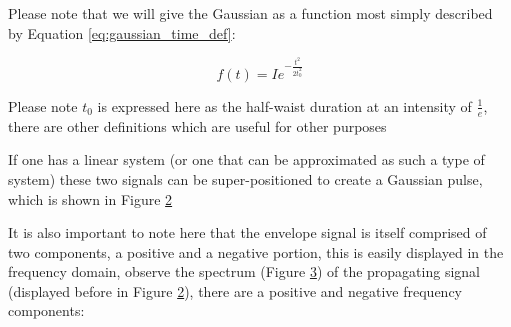\documentclass[colorlinks,11pt,a4paper,normalphoto,withhyper,ragged2e]{altareport}
\begin{document}
	Please note that we will give the Gaussian as a function most simply described by Equation \ref{eq:gaussian_time_def}:
	
	\begin{equation} \label{eq:gaussian_time_def}
		f(t) = I e^{-\frac{t^2}{2t^2_0}}
	\end{equation}
	
	{\footnotesize Please note $t_0$ is expressed here as the half-waist duration at an intensity of $\frac{1}{e}$, there are other definitions which are useful for other purposes} \linebreak
	
	If one has a linear system (or one that can be approximated as such a type of system) these two signals can be super-positioned to create a Gaussian pulse, which is shown in Figure \ref{fig:gaussian_demo} \linebreak
	
	\begin{figure}[h]
		\centering
		\scalebox{0.85}{}
		\caption{}
		\label{fig:gaussian_decon}
	\end{figure}	
	
	\vspace{5mm}
	
	\begin{figure}[h]
		\centering
		\scalebox{0.85}{}
		\caption{}
		\label{fig:gaussian_demo}
	\end{figure}	
	
	\pagebreak
	
	It is also important to note here that the envelope signal is itself comprised of two components, a positive and a negative portion, this is easily displayed in the frequency domain, observe the spectrum (Figure \ref{fig:gaussian_spectrum}) of the propagating signal (displayed before in Figure \ref{fig:gaussian_demo}), there are a positive and negative frequency components: \linebreak
	
	\begin{figure}[h]
		\centering
		\scalebox{0.85}{}
		\caption{}
		\label{fig:gaussian_spectrum}
	\end{figure}
	
\end{document}
